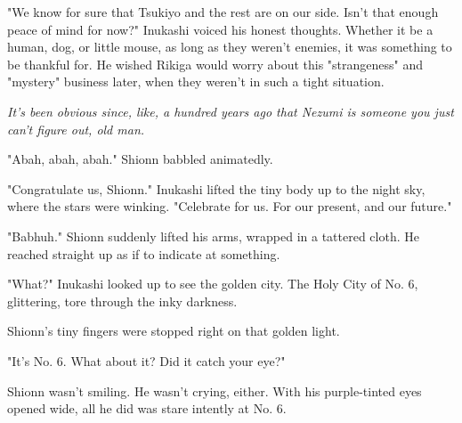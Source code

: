 "We know for sure that Tsukiyo and the rest are on our side. Isn't that
enough peace of mind for now?" Inukashi voiced his honest thoughts.
Whether it be a human, dog, or little mouse, as long as they weren't
enemies, it was something to be thankful for. He wished Rikiga would
worry about this "strangeness" and "mystery" business later, when they
weren't in such a tight situation.

\emph{It's been obvious since, like, a hundred years ago that Nezumi is
someone you just can't figure out, old man.}

"Abah, abah, abah." Shionn babbled animatedly.

"Congratulate us, Shionn." Inukashi lifted the tiny body up to the night
sky, where the stars were winking. "Celebrate for us. For our present,
and our future."

"Babhuh." Shionn suddenly lifted his arms, wrapped in a tattered cloth.
He reached straight up as if to indicate at something.

"What?" Inukashi looked up to see the golden city. The Holy City of No.
6, glittering, tore through the inky darkness.

Shionn's tiny fingers were stopped right on that golden light.

"It's No. 6. What about it? Did it catch your eye?"

Shionn wasn't smiling. He wasn't crying, either. With his purple-tinted
eyes opened wide, all he did was stare intently at No. 6.